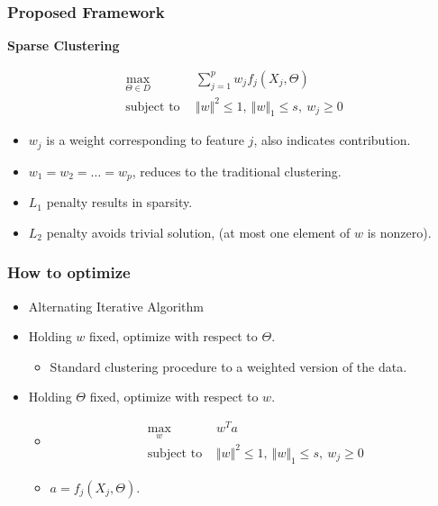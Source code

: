 \documentclass{beamer}
\begin{document}
\begin{frame}
\frametitle{Proposed Framework}
{\Large \bf Sparse Clustering}

\begin{eqnarray*}
\max_{\Theta \in D}&~~\sum_{j=1}^p w_jf_j (X_j, \Theta)\\
\text{subject to} &~~ \Vert w \Vert^2 \le 1,~\Vert w \Vert_1 \le s,~w_j \ge 0
\end{eqnarray*}
\begin{itemize}
    \item $w_j$ is a weight corresponding to feature $j$, also indicates contribution.
    \item $w_1=w_2=\ldots=w_p$, reduces to the traditional clustering.
    \item $L_1$ penalty results in sparsity.
    \item $L_2$ penalty avoids trivial solution, (at most one element of $w$ is nonzero).
\end{itemize}
\end{frame}
\begin{frame}
\frametitle{How to optimize}
\begin{itemize}
    \item Alternating Iterative Algorithm
    \item Holding $w$ fixed, optimize with respect to $\Theta$.
        \begin{itemize}
            \item Standard clustering procedure to a weighted version of the data.
        \end{itemize}
    \item Holding $\Theta$ fixed, optimize with respect to $w$.
        \begin{itemize}
            \item
            \begin{eqnarray*}
                \max_{w} & w^Ta\\
                \text{subject to } & \Vert w \Vert^2 \le 1,~ \Vert w \Vert_1 \le s, ~ w_j \ge 0
            \end{eqnarray*}
            \item $a = f_j(X_j, \Theta)$.
        \end{itemize}
\end{itemize}
\end{frame}
\end{document}
